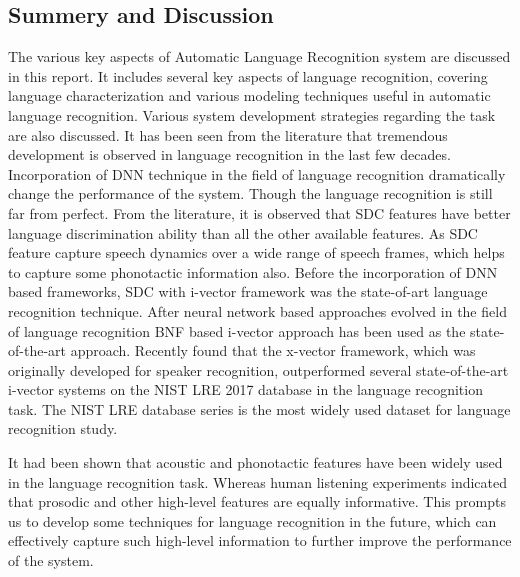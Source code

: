 \begin{spacing}{1.5}
\section{Summery and Discussion}
The various key aspects of Automatic Language Recognition system are discussed in this report. It includes several key aspects of language recognition, covering language characterization and various modeling techniques useful in automatic language recognition. Various system development strategies regarding the task are also discussed. It has been seen from the literature that tremendous development is observed in language recognition in the last few decades. Incorporation of DNN technique in the field of language recognition dramatically change the performance of the system. Though the language recognition is still far from perfect. From the literature, it is observed that SDC features have better language discrimination ability than all the other available features. As SDC feature capture speech dynamics over a wide range of speech frames, which helps to capture some phonotactic information also. Before the incorporation of DNN based frameworks, SDC with i-vector framework was the state-of-art language recognition technique. After neural network based approaches evolved in the field of language recognition BNF based i-vector approach has been used as the state-of-the-art approach. Recently found that the x-vector framework, which was originally developed for speaker recognition, outperformed several state-of-the-art i-vector systems on the NIST LRE 2017 database in the language recognition task. The NIST LRE database series is the most widely used dataset for language recognition study.

It had been shown that acoustic and phonotactic features have been widely used in the language recognition task. Whereas human listening experiments indicated that prosodic and other high-level features are equally informative. This prompts us to develop some techniques for language recognition in the future, which can effectively capture such high-level information to further improve the performance of the system.





% 
% 
% 
% 
\end{spacing} 